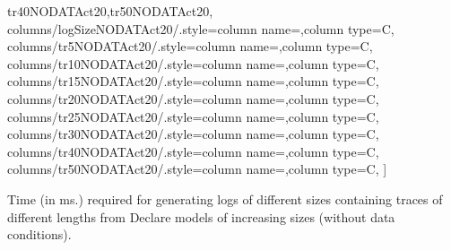 \begin{table}[b!]
\begin{center}
{{tr40NODATAct20,tr50NODATAct20},	
    columns/{logSizeNODATAct20}/.style={column name={},column type=C},	
    columns/{tr5NODATAct20}/.style={column name={},column type=C},
    columns/{tr10NODATAct20}/.style={column name={},column type=C},
    columns/{tr15NODATAct20}/.style={column name={},column type=C},
    columns/{tr20NODATAct20}/.style={column name={},column type=C},
    columns/{tr25NODATAct20}/.style={column name={},column type=C},
	columns/{tr30NODATAct20}/.style={column name={},column type=C},
    columns/{tr40NODATAct20}/.style={column name={},column type=C},
	columns/{tr50NODATAct20}/.style={column name={},column type=C},
]{\fileTWENTYconstNODATA}
}
\caption{Time (in ms.) required for generating logs of different sizes containing traces of different lengths from Declare models of increasing sizes (without data conditions).}
\label{table:exp_results_real}
\end{center}
\end{table}

